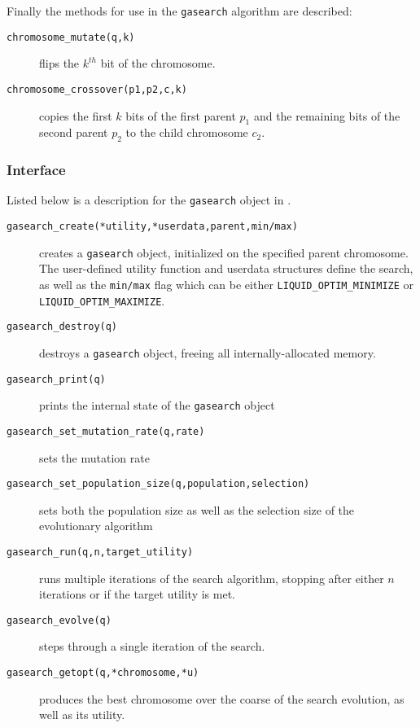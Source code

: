 %
Finally the methods for use in the {\tt gasearch} algorithm are
described:
%
\begin{description}
\item[{\tt chromosome\_mutate(q,k)}]
    flips the $k^{th}$ bit of the chromosome.
\item[{\tt chromosome\_crossover(p1,p2,c,k)}]
    copies the first $k$ bits of the first parent $p_1$
    and the remaining bits of the second parent $p_2$
    to the child chromosome $c_2$.
\end{description}
%

\subsubsection{Interface}
\label{module:optim:gasearch:interface}
%
Listed below is a description for the {\tt gasearch} object in
\liquid.
%
\begin{description}
\item[{\tt gasearch\_create(*utility,*userdata,parent,min/max)}]
    creates a {\tt gasearch} object, initialized on the specified
    parent chromosome.
    The user-defined utility function and userdata structures define the
    search, as well as the {\tt min/max} flag which can be either
    {\tt LIQUID\_OPTIM\_MINIMIZE} or
    {\tt LIQUID\_OPTIM\_MAXIMIZE}.
\item[{\tt gasearch\_destroy(q)}]
    destroys a {\tt gasearch} object, freeing all internally-allocated
    memory.
\item[{\tt gasearch\_print(q)}]
    prints the internal state of the {\tt gasearch} object
\item[{\tt gasearch\_set\_mutation\_rate(q,rate)}]
    sets the mutation rate
\item[{\tt gasearch\_set\_population\_size(q,population,selection)}]
    sets both the population size as well as the selection size of the
    evolutionary algorithm
\item[{\tt gasearch\_run(q,n,target\_utility)}]
    runs multiple iterations of the search algorithm,
    stopping after either $n$ iterations or if the target utility is
    met.
\item[{\tt gasearch\_evolve(q)}]
    steps through a single iteration of the search.
\item[{\tt gasearch\_getopt(q,*chromosome,*u)}]
    produces the best chromosome over the coarse of the search
    evolution, as well as its utility.
\end{description}
%

